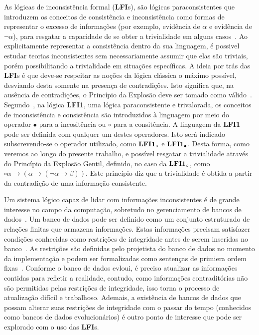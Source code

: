 As lógicas de inconsistência formal (\textbf{LFI}s), são lógicas paraconsistentes que introduzem os conceitos de consistência e inconsistência como formas de representar o excesso de informações (por exemplo, evidência de $\alpha$ e evidência de $\neg \alpha$), para resgatar a capacidade de se obter a trivialidade em alguns casos~\cite{carnielli2007}. Ao explicitamente representar a consistência dentro da sua linguagem, é possivel estudar teorias inconsistentes sem necessariamente assumir que elas são triviais, porém possibilitando a trivialidade em situações específicas. A ideia por trás das \textbf{LFI}s é que deve-se respeitar as noções da lógica clássica o máximo possível, desviando desta somente na presença de contradições. Isto significa que, na ausência de contradições, o Princípio da Explosão deve ser tomado como válido~\cite{sep-logic-paraconsistent}. Segundo~\cite{Carnielli_Coniglio_2016}, na lógica \textbf{LFI1}, uma lógica paraconsistente e trivalorada, os conceitos de inconsistência e consistência são introduzidos à linguagem por meio do operador $\bullet$ para a incositência ou $\circ$ para a consitência. A linguagem da \textbf{LFI1} pode ser definida com qualquer um destes operadores. Isto será indicado subscrevendo-se o operador utilizado, como $\text{\textbf{LFI1}}_{\circ}$ e $\text{\textbf{LFI1}}_{\bullet}$. Desta forma, como veremos ao longo do presente trabalho, e possível resgatar a trivialidade através do Princípio da Explosão Gentil, definido, no caso da $\text{\textbf{LFI1}}_{\circ}$, como $\circ \alpha \rightarrow (\alpha \rightarrow (\neg \alpha \rightarrow \beta))$\cite{carnielli2007}. Este princípio diz que a trivialidade é obtida a partir da contradição de uma informação consistente.

Um sistema lógico capaz de lidar com informações inconsistentes é de grande interesse no campo da computação, sobretudo no gerenciamento de bancos de dados~\cite{carnielli2000formal}. Um banco de dados pode ser definido como um conjunto estruturado de relações finitas que armazena informações. Estas informações precisam satisfazer condições conhecidas como restrições de integridade antes de serem inseridas no banco~\cite{Codd}. As restrições são definidas pelo projetista do banco de dados no momento da implementação e podem ser formalizadas como sentenças de primiera ordem fixas~\cite{carnielli2000formal}. Conforme o banco de dados evloui, é preciso atualizar as informações contidas para refletir a realidade, contudo, como informações contraditórias não são permitidas pelas restrições de integridade, isso torna o processo de atualização difícil e trabalhoso. Ademais, a existência de bancos de dados que possam alterar suas restrições de integridade com o passar do tempo (conhecidos como bancos de dados evolucionários) é outro ponto de interesse que pode ser explorado com o uso das \textbf{LFI}s.

